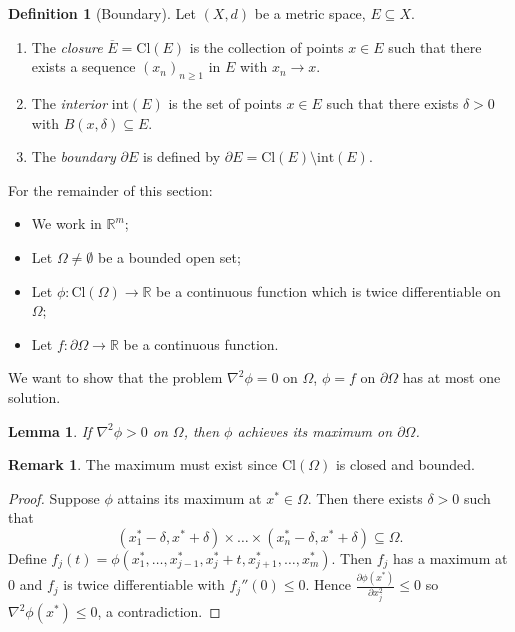 \documentclass[a4paper, 10pt, twocolumn]{amsart}
\newtheorem*{lemma}{Lemma}
\theoremstyle{definition}
\newtheorem*{definition}{Definition}
\newtheorem*{remark}{Remark}
\newcommand{\bb}[1]{\mathbb{#1}}
\newcommand{\sbs}[0]{\subseteq}
\newcommand{\Cl}[0]{\text{Cl}}
\newcommand{\1}{\mathbbm{1}}
\newcommand{\pdv}[2]{\frac{\partial #1}{\partial #2}}
\newcommand{\interior}{\text{int}}
\begin{document}
\begin{definition}[Boundary]
    Let $(X,d)$ be a metric space, $E \sbs X$. \begin{enumerate}
        \item The \textit{closure} $\overline{E} = \Cl(E)$ is the collection of points $x \in E$ such that there exists a sequence $(x_n)_{n\ge 1}$ in $E$ with $x_n \to x$.
        \item The \textit{interior} $\interior(E)$ is the set of points $x \in E$ such that there exists $\delta>0$ with $B(x,\delta)\sbs E$. 
        \item The \textit{boundary} $\partial E$ is defined by $\partial E = \Cl(E)\setminus \interior(E)$. 
    \end{enumerate}
\end{definition}

For the remainder of this section: \begin{itemize}
    \item We work in $\bb{R}^m$;
    \item Let $\Omega \ne \emptyset$ be a bounded open set;
    \item Let $\phi: \Cl(\Omega) \to \bb{R}$ be a continuous function which is twice differentiable on $\Omega$;
    \item Let $f: \partial \Omega \to \bb{R}$ be a continuous function. 
\end{itemize}
We want to show that the problem $\nabla^2 \phi = 0$ on $\Omega$, $\phi = f$ on $\partial \Omega$ has at most one solution.

\begin{lemma}
    If $\nabla^2 \phi >0$ on $\Omega$, then $\phi$ achieves its maximum on $\partial \Omega$. 
\end{lemma}

\begin{remark}
    The maximum must exist since $\Cl(\Omega)$ is closed and bounded.
\end{remark}

\begin{proof}
    Suppose $\phi$ attains its maximum at $x^\ast \in \Omega$. Then there exists $\delta>0$ such that \[(x_1^\ast-\delta,x^\ast+\delta)\times \ldots \times (x_n^\ast-\delta,x^\ast+\delta) \sbs \Omega.\]
    Define $f_j(t) = \phi(x_1^\ast,\ldots,x_{j-1}^\ast,x_j^\ast+t,x_{j+1}^\ast,\ldots,x_m^\ast)$. Then $f_j$ has a maximum at $0$ and $f_j$ is twice differentiable with $f_j''(0) \le 0$. Hence $\pdv{\phi(x^\ast)}{x_j^2} \le 0$ so $\nabla^2 \phi(x^\ast) \le 0$, a contradiction.
\end{proof}
\end{document}
